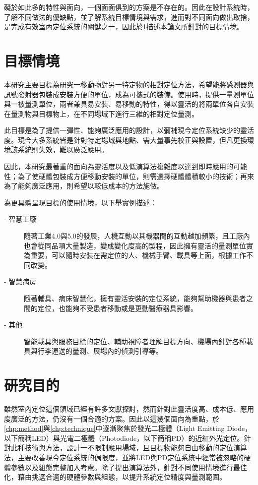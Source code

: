 礙於如此多的特性與面向，一個面面俱到的方案是不存在的。因此在設計系統時，了解不同做法的優缺點，並了解系統目標情境與需求，進而對不同面向做出取捨，是完成有效室內定位系統的關鍵之一\cite{survey_indoor2018}，因此於\ref{chp:motivate}描述本論文所針對的目標情境。







\section{目標情境}
\label{chp:motivate}
本研究主要目標為研究一移動物對另一特定物的相對定位方法，希望能將感測器與訊號發射器包裝成安裝方便的單位，成為可攜式的裝備。使用時，提供一量測單位與一被量測單位，兩者兼具易安裝、易移動的特性，得以靈活的將兩單位各自安裝在量測物與目標物上，在不同場域下進行三維的相對定位量測。

此目標是為了提供一彈性、能夠廣泛應用的設計，以彌補現今定位系統缺少的靈活度。現今大多系統皆是針對特定場域與地點、需大量事先校正與設置，但凡更換環境該系統則失效，難以廣泛應用。

因此，本研究最著重的面向為靈活度以及低演算法複雜度以達到即時應用的可能性；為了使硬體包裝成方便移動安裝的單位，則需選擇硬體體積較小的技術；再來為了能夠廣泛應用，則希望以較低成本的方法施做。

為更具體呈現目標的使用情境，以下舉實例描述：
\begin{description}
    \item[- 智慧工廠] 隨著工業4.0與5.0的發展，人機互動以其機器間的互動越加頻繁，且工廠內也會從同品項大量製造，變成變化度高的製程，因此擁有靈活的量測單位實為重要，可以隨時安裝在需定位的人、機械手臂、載具等上面，根據工作不同改變。
    \item[- 智慧病房] 隨著輔具、病床智慧化，擁有靈活安裝的定位系統，能夠幫助機器與患者之間的定位，也能夠不受患者移動或是更動醫療器具影響。
    \item[- 其他]  
    智能載具與服務目標的定位、輔助視障者理解目標方向、機場內針對各種載具與行李運送的量測、展場內的偵測引導等。
\end{description}






\section{研究目的}
\label{chp:purpose}
雖然室內定位這個領域已經有許多文獻探討，然而針對此靈活度高、成本低、應用度廣泛的方法，仍沒有一個合適的方案。因此以這幾個面向為重點，於\ref{chp:method}與\ref{chp:technique}中逐漸聚焦於發光二極體（Light Emitting Diode，以下簡稱LED）與光電二極體（Photodiode，以下簡稱PD）的近紅外光定位。針對此種技術與方法，設計一不限制應用場域，且目標物能夠自由移動的定位演算法，主要改善現今定位系統的侷限度，並將LED與PD定位系統中經常被忽略的硬體參數以及組態完整加入考慮。除了提出演算法外，針對不同使用情境進行最佳化，藉由挑選合適的硬體參數與組態，以提升系統定位精度與量測範圍。

